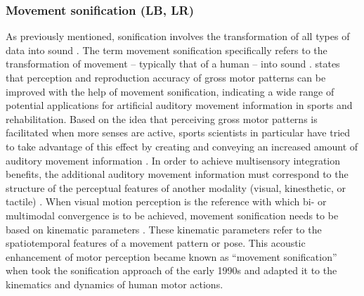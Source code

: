 \documentclass[10pt,a4paper,onecolumn]{article}
\begin{document}
\hypertarget{movement-sonification-lb-lr}{%
\subsubsection{Movement sonification (LB, LR)}\label{movement-sonification-lb-lr}}

As previously mentioned, sonification involves the transformation of all types of data into sound \autocite{kramerSonificationReportStatus1999}. The term movement sonification specifically refers to the transformation of movement -- typically that of a human -- into sound \autocite{vinkenAuditoryCodingHuman2013}. \textcite{effenbergMovementSonificationEffects2005} states that perception and reproduction accuracy of gross motor patterns can be improved with the help of movement sonification, indicating a wide range of potential applications for artificial auditory movement information in sports and rehabilitation. Based on the idea that perceiving gross motor patterns is facilitated when more senses are active, sports scientists in particular have tried to take advantage of this effect by creating and conveying an increased amount of auditory movement information \autocite{brockIfMotionSounds2012,kosBiofeedbackSportChallenges2015,schmitzPerceptualEffectsAuditory2012,vinkenAuditoryCodingHuman2013}. In order to achieve multisensory integration benefits, the additional auditory movement information must correspond to the structure of the perceptual features of another modality (visual, kinesthetic, or tactile) \autocite{schmitzSoundJoinedActions2017}. When visual motion perception is the reference with which bi- or multimodal convergence is to be achieved, movement sonification needs to be based on kinematic parameters \autocite{schmitzSoundJoinedActions2017}. These kinematic parameters refer to the spatiotemporal features of a movement pattern or pose. This acoustic enhancement of motor perception became known as ``movement sonification'' when \textcite{effenbergMovementSonificationEffects2005} took the sonification approach of the early 1990s and adapted it to the kinematics and dynamics of human motor actions.
\end{document}
